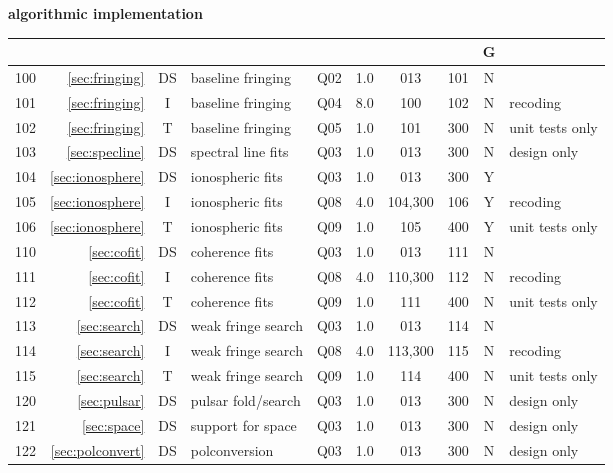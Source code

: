 \small
\textbf{algorithmic implementation}\hfill\break
\noindent
\begin{tabular}{r|r|c|l|c|c|c|c|c|l}
\hline
\usebox{\NM}&\usebox{\REF}&\usebox{\WW}&\usebox{\TPC}&\usebox{\ST}&\usebox{\EFF}&\usebox{\PRD}&\usebox{\SCC}&G&\usebox{\CMTS}\\
\hline
\hline
100&\ref{sec:fringing}             &DS& baseline fringing    & Q02 & 1.0 & 013     & 101 & N &  \\
101&\ref{sec:fringing}             &I & baseline fringing    & Q04 & 8.0 & 100     & 102 & N & recoding \\
102&\ref{sec:fringing}             &T & baseline fringing    & Q05 & 1.0 & 101     & 300 & N & unit tests only \\
103&\ref{sec:specline}             &DS& spectral line fits   & Q03 & 1.0 & 013     & 300 & N & design only \\
104&\ref{sec:ionosphere}           &DS& ionospheric fits     & Q03 & 1.0 & 013     & 300 & Y &  \\
105&\ref{sec:ionosphere}           &I & ionospheric fits     & Q08 & 4.0 & 104,300 & 106 & Y & recoding \\
106&\ref{sec:ionosphere}           &T & ionospheric fits     & Q09 & 1.0 & 105     & 400 & Y & unit tests only \\
110&\ref{sec:cofit}                &DS& coherence fits       & Q03 & 1.0 & 013     & 111 & N &  \\
111&\ref{sec:cofit}                &I & coherence fits       & Q08 & 4.0 & 110,300 & 112 & N & recoding \\
112&\ref{sec:cofit}                &T & coherence fits       & Q09 & 1.0 & 111     & 400 & N & unit tests only \\
113&\ref{sec:search}               &DS& weak fringe search   & Q03 & 1.0 & 013     & 114 & N &  \\
114&\ref{sec:search}               &I & weak fringe search   & Q08 & 4.0 & 113,300 & 115 & N & recoding \\
115&\ref{sec:search}               &T & weak fringe search   & Q09 & 1.0 & 114     & 400 & N & unit tests only \\
120&\ref{sec:pulsar}               &DS& pulsar fold/search   & Q03 & 1.0 & 013     & 300 & N & design only \\
121&\ref{sec:space}                &DS& support for space    & Q03 & 1.0 & 013     & 300 & N & design only \\
122&\ref{sec:polconvert}           &DS& polconversion        & Q03 & 1.0 & 013     & 300 & N & design only \\
\hline
\end{tabular}\vspace{6mm}

